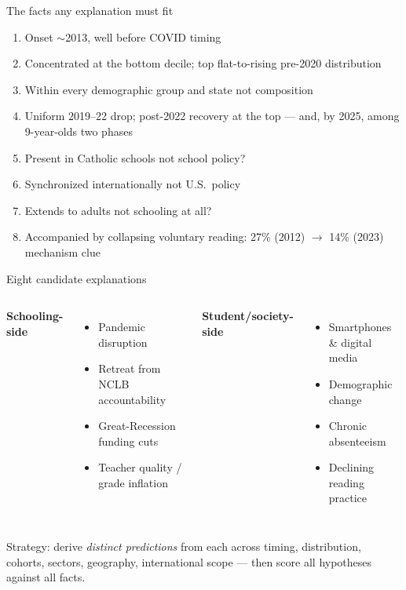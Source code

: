 \documentclass[11pt,aspectratio=169]{beamer}
\newcommand{\gray}[1]{\textcolor{ltgray}{#1}}
\begin{document}
\begin{frame}{The facts any explanation must fit}
\begin{enumerate}
\item Onset $\sim$2013, well before COVID \hfill \gray{timing}
\item Concentrated at the bottom decile; top flat-to-rising pre-2020 \hfill \gray{distribution}
\item Within every demographic group and state \hfill \gray{not composition}
\item Uniform 2019--22 drop; post-2022 recovery at the top --- and, by 2025, among 9-year-olds \hfill \gray{two phases}
\item Present in Catholic schools \hfill \gray{not school policy?}
\item Synchronized internationally \hfill \gray{not U.S.\ policy}
\item Extends to adults \hfill \gray{not schooling at all?}
\item Accompanied by collapsing voluntary reading: 27\% (2012) $\to$ 14\% (2023) \hfill \gray{mechanism clue}
\end{enumerate}
\end{frame}

\begin{frame}{Eight candidate explanations}
\begin{columns}[t]
\textbf{Schooling-side}
\begin{itemize}
\item[H1] Pandemic disruption
\item[H3] Retreat from NCLB accountability
\item[H4] Great-Recession funding cuts
\item[H8] Teacher quality / grade inflation
\end{itemize}
\textbf{Student/society-side}
\begin{itemize}
\item[H2] Smartphones \& digital media
\item[H5] Demographic change
\item[H6] Chronic absenteeism
\item[H7] Declining reading practice
\end{itemize}
\end{columns}
\vspace{6pt}
Strategy: derive \emph{distinct predictions} from each across timing, distribution, cohorts, sectors, geography, international scope --- then score all hypotheses against all facts.
\end{frame}
\end{document}
